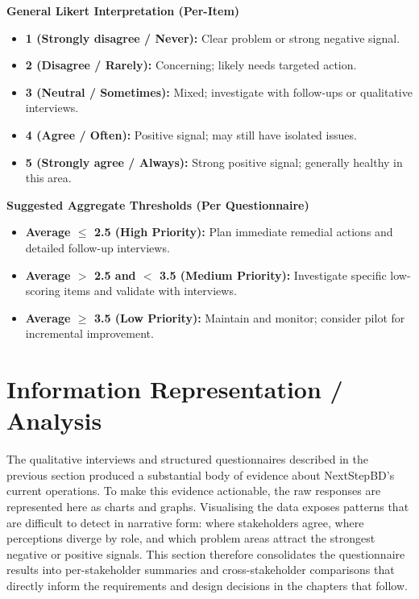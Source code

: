 \documentclass[12pt,a4paper]{report}
\begin{document}
\begin{noteBox}
\textbf{General Likert Interpretation (Per-Item)}
\begin{itemize}[leftmargin=1.5em]
    \item \textbf{1 (Strongly disagree / Never):} Clear problem or strong negative signal.
    \item \textbf{2 (Disagree / Rarely):} Concerning; likely needs targeted action.
    \item \textbf{3 (Neutral / Sometimes):} Mixed; investigate with follow-ups or qualitative interviews.
    \item \textbf{4 (Agree / Often):} Positive signal; may still have isolated issues.
    \item \textbf{5 (Strongly agree / Always):} Strong positive signal; generally healthy in this area.
\end{itemize}
\end{noteBox}

\begin{summaryBox}
\textbf{Suggested Aggregate Thresholds (Per Questionnaire)}
\begin{itemize}[leftmargin=1.5em]
    \item \textbf{Average $\leq$ 2.5 (High Priority):} Plan immediate remedial actions and detailed follow-up interviews.
    \item \textbf{Average $>$ 2.5 and $<$ 3.5 (Medium Priority):} Investigate specific low-scoring items and validate with interviews.
    \item \textbf{Average $\geq$ 3.5 (Low Priority):} Maintain and monitor; consider pilot for incremental improvement.
\end{itemize}
\end{summaryBox}

\section{Information Representation / Analysis}
The qualitative interviews and structured questionnaires described in the previous section produced a substantial body of evidence about NextStepBD's current operations. To make this evidence actionable, the raw responses are represented here as charts and graphs. Visualising the data exposes patterns that are difficult to detect in narrative form: where stakeholders agree, where perceptions diverge by role, and which problem areas attract the strongest negative or positive signals. This section therefore consolidates the questionnaire results into per-stakeholder summaries and cross-stakeholder comparisons that directly inform the requirements and design decisions in the chapters that follow.
\end{document}
